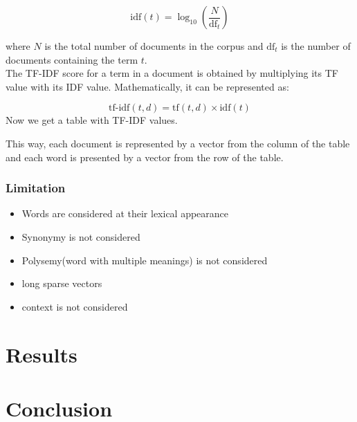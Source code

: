 \documentclass[12pt]{article}
\begin{document}
            \[
            \text{idf}(t) = \log_{10} \left( \frac{N}{\text{df}_{t}}\right)
            \]
            
            where $N$ is the total number of documents in the corpus and $\text{df}_{t}$ is the number of documents containing the term $t$.
            \\
            The TF-IDF score for a term in a document is obtained by multiplying its TF value with its IDF value. Mathematically, it can be represented as:

            \[
            \text{tf-idf}(t, d) = \text{tf}(t, d) \times \text{idf}(t)
            \]
            Now we get a table with TF-IDF values.
            
            This way, each document is represented by a vector from the column
            of the table and each word is presented by a vector from
            the row of the table.

            \subsubsection{Limitation}
            \begin{itemize}
                \item Words are considered at their lexical appearance
                \item Synonymy is not considered
                \item Polysemy(word with multiple meanings) is not considered
                \item long sparse vectors
                \item context is not considered
            \end{itemize}

            

\section{Results}
\lipsum[5-6] %

\section{Conclusion}
\lipsum[7] %
\end{document}
